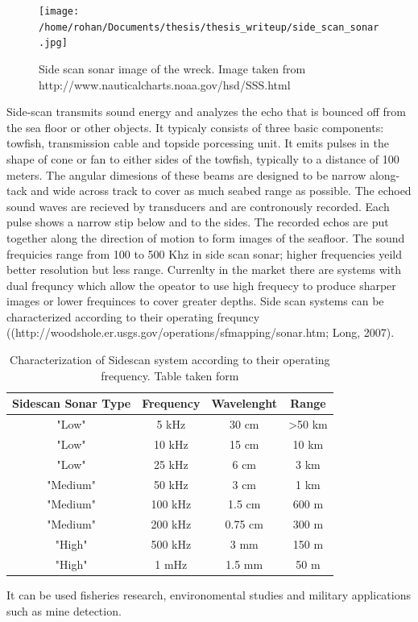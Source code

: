 \documentclass[12pt,draft]{dalcsthesis}
\begin{document}
\begin{figure}
  \centering
     {\texttt{[image: /home/rohan/Documents/thesis/thesis\_writeup/side\_scan\_sonar.jpg]}}
  \caption{\label{fig- side scan sonar image} Side scan sonar image of the wreck. Image taken from \cite{}{http://www.nauticalcharts.noaa.gov/hsd/SSS.html} }
\end{figure}

Side-scan transmits sound energy and analyzes the echo that is bounced off from the sea floor or other objects. It typicaly consists of three basic components: towfish, transmission cable and topside porcessing unit. It emits pulses in the shape of cone or fan to either sides of the towfish, typically to a distance of 100 meters. The angular dimesions of these beams are designed to be narrow along-tack and wide across track to cover as much seabed range as possible.  The echoed sound waves are recieved by transducers and are contronously recorded. Each pulse shows a narrow stip below and to the sides.  The recorded echos are put together along the direction of motion to form images of the seafloor. The sound frequicies range from 100 to 500 Khz in side scan sonar; higher frequencies yeild better resolution but less range. Currenlty in the market there are systems with dual frequncy which allow the opeator to use high frequecy to produce sharper images or lower frequinces to cover greater depths. Side scan 
systems can be characterized according to their operating frequncy ((http://woodshole.er.usgs.gov/operations/sfmapping/sonar.htm; Long, 2007).

\begin{table}

\begin{tabular}{|c|c|c|c|}
\hline 
Sidescan Sonar Type & Frequency & Wavelenght & Range \\ 
\hline 
"Low" & 5 kHz & 30 cm & >50 km \\ 
\hline 
"Low" & 10 kHz & 15 cm & 10 km \\ 
\hline 
"Low" & 25 kHz & 6 cm & 3 km \\ 
\hline 
"Medium" & 50 kHz & 3 cm & 1 km \\ 
\hline 
"Medium" & 100 kHz & 1.5 cm & 600 m \\ 
\hline 
"Medium" & 200 kHz & 0.75 cm & 300 m \\ 
\hline 
"High" & 500 kHz & 3 mm & 150 m \\ 
\hline 
"High" & 1 mHz & 1.5 mm & 50 m \\ 
\hline 
\end{tabular} 
\caption{\label{tab-: classification of side scan} Characterization of Sidescan system according to their operating frequency. Table taken form \cite{Menezes}} 
\end{table}
It can be used fisheries research, environomental studies and military applications such as mine detection. 
\end{document}
